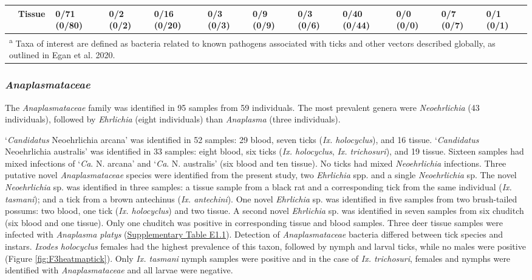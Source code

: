 \documentclass[a4paper, nobind]{templates/ociamthesis}
\begin{document}
\begin{landscape}
\begin{table}
\begin{tabular}[t]{>{}l>{}lllllllllll}
\em{} & \textbf{Tissue} & 0/71 (0/80) & 0/2 (0/2) & 0/16 (0/20) & 0/3 (0/3) & 0/9 (0/9) & 0/3 (0/6) & 0/40 (0/44) & 0/0 (0/0) & 0/7 (0/7) & 0/1 (0/1)\\
\bottomrule
\multicolumn{12}{l}{\rule{0pt}{1em}\textsuperscript{a} Taxa of interest are defined as bacteria related to known pathogens associated with ticks and other vectors described globally, as outlined in Egan et al. 2020.}\\
\end{tabular}
\end{table}
\end{landscape}

\hypertarget{anaplasmataceae-2}{%
\subsubsection{\texorpdfstring{\emph{Anaplasmataceae}}{Anaplasmataceae}}\label{anaplasmataceae-2}}

The \emph{Anaplasmataceae} family was identified in 95 samples from 59 individuals.
The most prevalent genera were \emph{Neoehrlichia} (43 individuals), followed by \emph{Ehrlichia} (eight individuals) than \emph{Anaplasma} (three individuals).

`\emph{Candidatus} Neoehrlichia arcana' was identified in 52 samples: 29 blood, seven ticks (\emph{Ix. holocyclus}), and 16 tissue. `\emph{Candidatus} Neoehrlichia australis' was identified in 33 samples: eight blood, six ticks (\emph{Ix. holocyclus}, \emph{Ix. trichosuri}), and 19 tissue.
Sixteen samples had mixed infections of `\emph{Ca}. N. arcana' and `\emph{Ca}. N. australis' (six blood and ten tissue).
No ticks had mixed \emph{Neoehrlichia} infections.
Three putative novel \emph{Anaplasmataceae} species were identified from the present study, two \emph{Ehrlichia} spp. and a single \emph{Neoehrlichia} sp.
The novel \emph{Neoehrlichia} sp. was identified in three samples: a tissue sample from a black rat and a corresponding tick from the same individual (\emph{Ix. tasmani}); and a tick from a brown antechinus (\emph{Ix. antechini}).
One novel \emph{Ehrlichia} sp. was identified in five samples from two brush-tailed possums: two blood, one tick (\emph{Ix. holocyclus}) and two tissue.
A second novel \emph{Ehrlichia} sp. was identified in seven samples from six chuditch (six blood and one tissue). Only one chuditch was positive in corresponding tissue and blood samples.
Three deer tissue samples were infected with \emph{Anaplasma platys} (\protect\hyperlink{supplementary-table-e1.1}{Supplementary Table E1.1}).
Detection of \emph{Anaplasmataceae} bacteria differed between tick species and instars.
\emph{Ixodes holocyclus} females had the highest prevalence of this taxon, followed by nymph and larval ticks, while no males were positive (Figure \ref{fig:F3heatmaptick}).
Only \emph{Ix. tasmani} nymph samples were positive and in the case of \emph{Ix. trichosuri}, females and nymphs were identified with \emph{Anaplasmataceae} and all larvae were negative.
\end{document}
